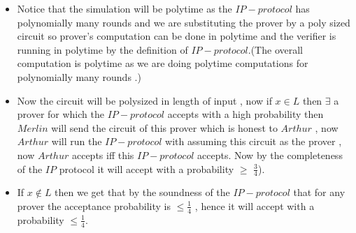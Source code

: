 \documentclass[a4paper, 11pt]{article}
\begin{document}
{\begin{itemize}
		\item Notice that the simulation will be polytime as the $IP-protocol $ has polynomially many rounds and we are substituting the prover by a poly sized circuit so  prover's computation can be done in polytime and the verifier is running in polytime by the definition of $IP-protocol$.(The overall computation is polytime as we are doing polytime computations for polynomially many rounds .)
		\item Now the circuit will be polysized in length of input , now if $x \in L$ then $\exists $ a  prover for which the $IP-protocol$ accepts with a high probability then $Merlin$ will send the circuit of this prover which is honest to $Arthur $ , now $Arthur$ will run the $IP-protocol $ with assuming this circuit as the prover , now $Arthur$ accepts iff this $IP-protocol$ accepts. Now by the completeness of the $IP$ protocol it will accept with a probability $\geq$ $\frac{3}{4}$).
		 \item If $x \notin L$ then we get that by the soundness of the $IP-protocol$ that for any prover the acceptance probability is $\leq \frac{1}{4}$ , hence it will accept with a probability $\leq \frac{1}{4 }$.
		\end{itemize}
	}
	
	

	

	
\end{document}
